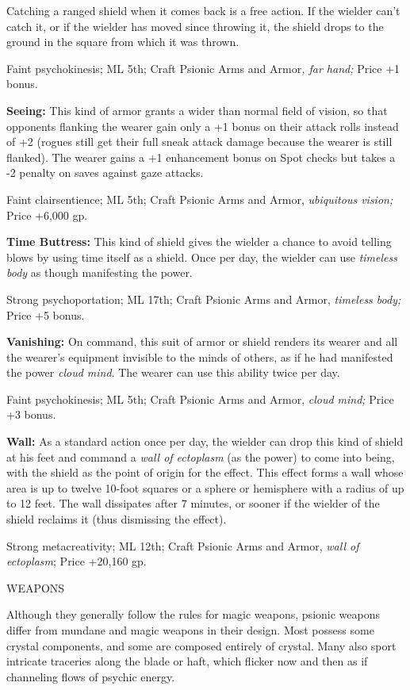 \documentclass{article}
\begin{document}
Catching a ranged shield when it comes back is a free action. If the wielder can't 
catch it, or if the wielder has moved since throwing it, the shield drops to the 
ground in the square from which it was thrown.

Faint psychokinesis; ML 5th; Craft Psionic Arms and Armor\textit{, far hand; }Price 
+1 bonus.

\textbf{Seeing:} This kind of armor grants a wider than normal field of vision, 
so that opponents flanking the wearer gain only a +1 bonus on their attack rolls 
instead of +2 (rogues still get their full sneak attack damage because the wearer 
is still flanked). The wearer gains a +1 enhancement bonus on Spot checks but takes 
a -2 penalty on saves against gaze attacks.

Faint clairsentience; ML 5th; Craft Psionic Arms and Armor, \textit{ubiquitous 
vision; }Price +6,000 gp.

\textbf{Time Buttress:} This kind of shield gives the wielder a chance to avoid 
telling blows by using time itself as a shield. Once per day, the wielder can use 
\textit{timeless body }as though manifesting the power.

Strong psychoportation; ML 17th; Craft Psionic Arms and Armor, \textit{timeless 
body; }Price +5 bonus.

\textbf{Vanishing: }On command, this suit of armor or shield renders its wearer 
and all the wearer's equipment invisible to the minds of others, as if he had manifested 
the power \textit{cloud mind}. The wearer can use this ability twice per day.

Faint psychokinesis; ML 5th; Craft Psionic Arms and Armor, \textit{cloud mind; 
}Price +3 bonus.

\textbf{Wall:} As a standard action once per day, the wielder can drop this kind 
of shield at his feet and command a \textit{wall of ectoplasm }(as the power) to 
come into being, with the shield as the point of origin for the effect. This effect 
forms a wall whose area is up to twelve 10-foot squares or a sphere or hemisphere 
with a radius of up to 12 feet. The wall dissipates after 7 minutes, or sooner 
if the wielder of the shield reclaims it (thus dismissing the effect).

Strong metacreativity; ML 12th; Craft Psionic Arms and Armor, \textit{wall of ectoplasm}; 
Price +20,160 gp.

\vspace{12pt}
WEAPONS

Although they generally follow the rules for magic weapons, psionic weapons differ 
from mundane and magic weapons in their design. Most possess some crystal components, 
and some are composed entirely of crystal. Many also sport intricate traceries 
along the blade or haft, which flicker now and then as if channeling flows of psychic 
energy.
\end{document}
